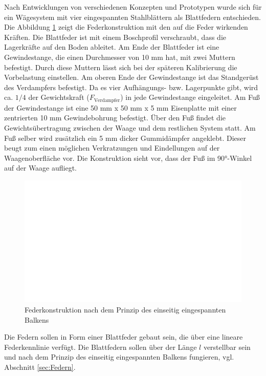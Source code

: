 Nach Entwicklungen von verschiedenen Konzepten und Prototypen wurde sich für ein Wägesystem mit vier eingespannten Stahlblättern als Blattfedern entschieden.  Die Abbildung \ref{fig:Feder} zeigt die Federkonstruktion mit den auf die Feder wirkenden Kräften. Die Blattfeder ist mit einem Boschprofil verschraubt, dass die Lagerkräfte auf den Boden ableitet. Am Ende der Blattfeder ist eine Gewindestange, die einen Durchmesser von 10 mm hat,  mit zwei Muttern befestigt. Durch diese Muttern lässt sich bei der späteren Kalibrierung die Vorbelastung einstellen. Am oberen Ende der Gewindestange ist das Standgerüst des Verdampfers befestigt. Da es vier Aufhängungs- bzw. Lagerpunkte gibt, wird ca. $1/4$ der Gewichtskraft ($F_{\text{Verdampfer}}$) in jede Gewindestange eingeleitet. Am Fuß der Gewindestange ist eine 50 mm x 50 mm x 5 mm Eisenplatte mit einer zentrierten 10 mm Gewindebohrung befestigt. Über den Fuß findet die Gewichtsübertragung zwischen der Waage und dem restlichen System statt. Am Fuß selber wird zusätzlich ein 5 mm dicker Gummidämpfer angeklebt. Dieser beugt zum einen möglichen Verkratzungen und Eindellungen auf der Waagenoberfläche vor. Die Konstruktion sieht vor, dass der Fuß im 90°-Winkel auf der Waage aufliegt. 

\begin{figure}
\centering		\includegraphics[page=7,width=1.10\textwidth]{Pictures/Feder.pdf}
\caption{Federkonstruktion nach dem Prinzip des einseitig eingespannten Balkens}
\label{fig:Feder}
\end{figure}






Die Federn sollen in Form einer Blattfeder gebaut sein, die über eine lineare Federkennlinie verfügt. Die Blattfedern sollen über der Länge $l$ verstellbar sein und nach dem Prinzip des einseitig eingespannten Balkens fungieren, vgl. Abschnitt \ref{sec:Federn}. 

